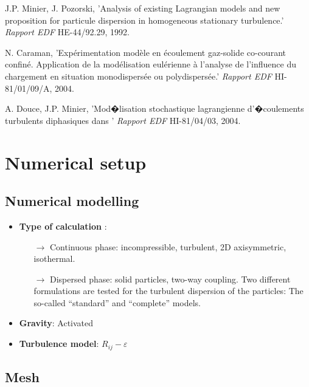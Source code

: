 \documentclass[a4paper,twoside,12pt]{article}
\begin{document}
\begin{thebibliography}{3}
    J.P. Minier, J. Pozorski,
   'Analysis of existing Lagrangian models and new
   proposition for particule dispersion in
   homogeneous stationary turbulence.'
   {\it Rapport EDF} HE-44/92.29, 1992.

    N. Caraman,
   'Exp\'erimentation mod\`ele en \'ecoulement gaz-solide co-courant confin\'e.
   Application de la mod\'elisation eul\'erienne \`a l'analyse de l'influence
   du chargement en situation monodispers\'ee ou polydispers\'ee.'
   {\it Rapport EDF} HI-81/01/09/A, 2004.

    A. Douce, J.P. Minier,
   'Mod�lisation stochastique lagrangienne d'�coulements turbulents
   diphasiques dans \CS'
   {\it Rapport EDF} HI-81/04/03, 2004.

\end{thebibliography}

\section{Numerical setup}

\subsection{Numerical modelling}

\begin{itemize}

   \item \textbf{Type of calculation} :
         \begin{itemize}
            \item[$\rightarrow$] Continuous phase: incompressible, turbulent, 2D axisymmetric, isothermal.
            \item[$\rightarrow$] Dispersed phase: solid particles, two-way coupling. Two different formulations are tested for the turbulent dispersion of the particles: The so-called ``standard'' and ``complete'' models.
         \end{itemize}

   \item \textbf{Gravity}: Activated

   \item \textbf{Turbulence model}: $R_{ij}-\varepsilon$

\end{itemize}

\subsection{Mesh}
\end{document}
